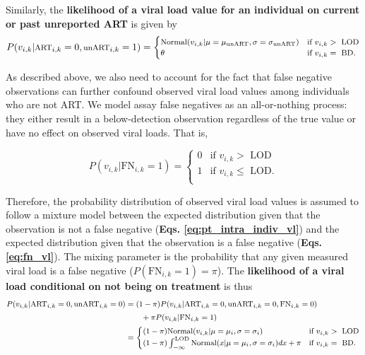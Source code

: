 \documentclass{article}[11pt]
\begin{document}
Similarly, the \textbf{likelihood of a viral load value for an individual on current or past unreported ART} is given by
\begin{equation}
\footnotesize
P(v_{i,k}|\text{ART}_{i,k}=0,\text{unART}_{i,k}=1) = \begin{cases} 
    \text{Normal}(v_{i,k} | \mu=\mu_\text{unART}, \sigma=\sigma_\text{unART}) & \text{if } v_{i,k} >\text{ LOD} \\
     \theta & \text{if } v_{i,k} =\text{ BD}.
\end{cases}
\label{eq:unart_intra_indiv_vl}
\end{equation}

As described above, we also need to account for the fact that false negative observations can further confound observed viral load values among individuals who are not ART. We model assay false negatives as an all-or-nothing process: they either result in a below-detection observation regardless of the true value or have no effect on observed viral loads. That is, 

\begin{equation}
P(v_{i,k}|\text{FN}_{i,k}=1) = \begin{cases} 
    0 & \text{if } v_{i,k} >\text{ LOD} \\
    1 & \text{if } v_{i,k} \leq\text{ LOD}. \\
\end{cases}
\label{eq:fn_vl}
\end{equation}

Therefore, the probability distribution of observed viral load values is assumed to follow a mixture model between the expected distribution given that the observation is not a false negative (\textbf{Eqs. \ref{eq:pt_intra_indiv_vl}}) and the expected distribution given that the observation is a false negative (\textbf{Eqs. \ref{eq:fn_vl}}). The mixing parameter is the probability that any given measured viral load is a false negative ($P(\text{FN}_{i,k}=1) = \pi$). The \textbf{likelihood of a viral load conditional on not being on treatment} is thus 
\begin{align}
\footnotesize
\begin{split}
P(v_{i,k}|\text{ART}_{i,k}=0,\text{unART}_{i,k}=0) &= (1-\pi)P(v_{i,k}|\text{ART}_{i,k}=0,\text{unART}_{i,k}=0, \text{FN}_{i,k}=0) \\
    &\qquad + \pi P(v_{i,k}|\text{FN}_{i,k}=1) \\
    & = \begin{cases}
        (1-\pi) \text{Normal}(v_{i,k} | \mu=\mu_i, \sigma=\sigma_i)  & \text{if } v_{i,k} >\text{ LOD} \\
        (1-\pi) \int_{-\infty}^\text{LOD}\text{Normal}(x | \mu=\mu_i, \sigma=\sigma_i)dx + \pi  & \text{if } v_{i,k} =\text{ BD}. \\
    \end{cases}
\end{split}
\end{align}
\end{document}
